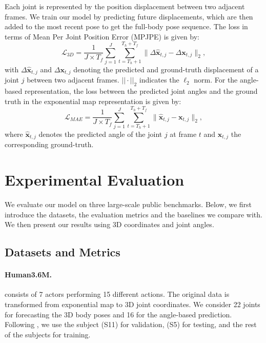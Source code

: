 \documentclass{article}
\begin{document}
 Each joint is represented by the position displacement between two adjacent frames. We train our model by predicting future displacements, which are then added to the most recent pose to get the full-body pose sequence. The loss in terms of Mean Per Joint Position Error (MPJPE) is given by:
\begin{equation}\label{input_loss}
\mathcal{L}_{3D} = \frac{1}{J \times T_f}  \sum_{j=1}^{J} \sum_{t=T_h +1 }^{T_h+T_f}  \parallel \Delta \mathbf{\hat{x}}_{t,j}  - \Delta \mathbf{x}_{t,j} \parallel_2,
\end{equation}
with $\Delta \mathbf{\hat{x}}_{t,j}$ and $\Delta \mathbf{x}_{t,j}$ denoting the predicted and ground-truth displacement of a joint $j$ between two adjacent frames. $||\cdot||_2$ indicates the $\ell_2$ norm. For the angle-based representation, the loss between the predicted joint angles and the ground truth in the exponential map representation   is given by:
\begin{equation}\label{input_mae}
\mathcal{L}_{MAE} = \frac{1}{J \times T_f}  \sum_{j=1}^{J} \sum_{t=T_h +1}^{T_h+T_f}  \parallel \mathbf{\hat{x}}_{t,j}  -  \mathbf{x}_{t,j} \parallel_2,
\end{equation}
where  $ \mathbf{\hat{x}}_{t,j}$ denotes the predicted angle of the joint $j$ at frame $t$ and $ \mathbf{x}_{t,j}$ the corresponding ground-truth.  

\section {Experimental Evaluation}
We evaluate our model on three large-scale public benchmarks. Below, we first introduce the datasets, the evaluation metrics and the baselines we compare with. We then present our results using 3D coordinates and joint angles.

\subsection{Datasets and Metrics}
\paragraph{Human3.6M.} \cite{ionescu2013human3} consists of 7 actors performing 15 different actions. The original data is transformed from exponential map to 3D joint coordinates. We consider 22 joints for forecasting the 3D body poses and 16 for the angle-based prediction.  Following \cite{sofianos2021space,mao2020history}, we use the subject (S11) for validation, (S5) for testing, and the rest of the subjects for training.
\end{document}
